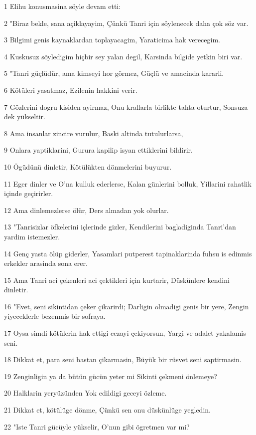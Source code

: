 \par 1 Elihu konusmasina söyle devam etti:
\par 2 "Biraz bekle, sana açiklayayim, Çünkü Tanri için söylenecek daha çok söz var.
\par 3 Bilgimi genis kaynaklardan toplayacagim, Yaraticima hak verecegim.
\par 4 Kuskusuz söyledigim hiçbir sey yalan degil, Karsinda bilgide yetkin biri var.
\par 5 "Tanri güçlüdür, ama kimseyi hor görmez, Güçlü ve amacinda kararli.
\par 6 Kötüleri yasatmaz, Ezilenin hakkini verir.
\par 7 Gözlerini dogru kisiden ayirmaz, Onu krallarla birlikte tahta oturtur, Sonsuza dek yükseltir.
\par 8 Ama insanlar zincire vurulur, Baski altinda tutulurlarsa,
\par 9 Onlara yaptiklarini, Gurura kapilip isyan ettiklerini bildirir.
\par 10 Ögüdünü dinletir, Kötülükten dönmelerini buyurur.
\par 11 Eger dinler ve O'na kulluk ederlerse, Kalan günlerini bolluk, Yillarini rahatlik içinde geçirirler.
\par 12 Ama dinlemezlerse ölür, Ders almadan yok olurlar.
\par 13 "Tanrisizlar öfkelerini içlerinde gizler, Kendilerini bagladiginda Tanri'dan yardim istemezler.
\par 14 Genç yasta ölüp giderler, Yasamlari putperest tapinaklarinda fuhsu is edinmis erkekler arasinda sona erer.
\par 15 Ama Tanri aci çekenleri aci çektikleri için kurtarir, Düskünlere kendini dinletir.
\par 16 "Evet, seni sikintidan çeker çikarirdi; Darligin olmadigi genis bir yere, Zengin yiyeceklerle bezenmis bir sofraya.
\par 17 Oysa simdi kötülerin hak ettigi cezayi çekiyorsun, Yargi ve adalet yakalamis seni.
\par 18 Dikkat et, para seni bastan çikarmasin, Büyük bir rüsvet seni saptirmasin.
\par 19 Zenginligin ya da bütün gücün yeter mi Sikinti çekmeni önlemeye?
\par 20 Halklarin yeryüzünden Yok edildigi geceyi özleme.
\par 21 Dikkat et, kötülüge dönme, Çünkü sen onu düskünlüge yegledin.
\par 22 "Iste Tanri gücüyle yükselir, O'nun gibi ögretmen var mi?
